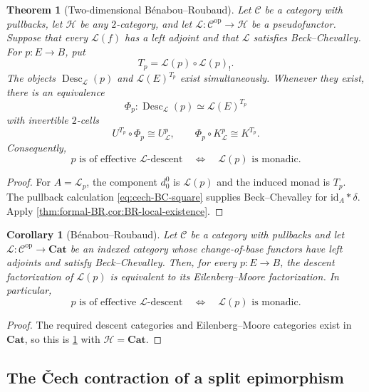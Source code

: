 \documentclass[11pt,a4paper]{article}
\numberwithin{equation}{section}
\newtheorem{theorem}{Theorem}[section]
\newtheorem{corollary}[corollary]{Corollary}
\theoremstyle{definition}
\theoremstyle{remark}
\newcommand{\id}{\mathrm{id}}
\newcommand{\Hcat}{\mathcal H}
\newcommand{\C}{\mathcal C}
\newcommand{\Lx}{\mathcal L}
\newcommand{\Cat}{\mathbf{Cat}}
\newcommand{\Desc}{\operatorname{Desc}}
\begin{document}
\begin{theorem}[Two-dimensional B\'enabou--Roubaud]
\label{thm:two-dimensional-BR}
Let $\C$ be a category with pullbacks, let $\Hcat$ be any
$2$-category, and let
$\Lx\colon\C^{\mathrm{op}}\to\Hcat$ be a pseudofunctor. Suppose that
every $\Lx(f)$ has a left adjoint and that $\Lx$ satisfies
Beck--Chevalley. For $p\colon E\to B$, put
\[
  T_p=\Lx(p)\circ\Lx(p)_!.
\]
The objects $\Desc_{\Lx}(p)$ and $\Lx(E)^{T_p}$ exist simultaneously.
Whenever they exist, there is an equivalence
\begin{equation}
  \Phi_p\colon
  \Desc_{\Lx}(p)\simeq\Lx(E)^{T_p}
  \label{eq:indexed-BR-equivalence}
\end{equation}
with invertible $2$-cells
\[
  U^{T_p}\circ\Phi_p\cong U_{\Lx}^{p},
  \qquad
  \Phi_p\circ K_{\Lx}^{p}\cong K^{T_p}.
\]
Consequently,
\[
  p\text{ is of effective }\Lx\text{-descent}
  \quad\Longleftrightarrow\quad
  \Lx(p)\text{ is monadic}.
\]
\end{theorem}

\begin{proof}
For $A=\Lx_p$, the component $d_0^0$ is $\Lx(p)$ and the induced
monad is $T_p$. The pullback calculation
\eqref{eq:cech-BC-square} supplies Beck--Chevalley for $\id_A\ast\delta$.
Apply \cref{thm:formal-BR,cor:BR-local-existence}.
\end{proof}

\begin{corollary}[B\'enabou--Roubaud]
\label{cor:classical-BR}
Let $\C$ be a category with pullbacks and let
$\Lx\colon\C^{\mathrm{op}}\to\Cat$ be an indexed category whose
change-of-base functors have left adjoints and satisfy
Beck--Chevalley. Then, for every $p\colon E\to B$, the descent
factorization of $\Lx(p)$ is equivalent to its Eilenberg--Moore
factorization. In particular,
\[
  p\text{ is of effective }\Lx\text{-descent}
  \quad\Longleftrightarrow\quad
  \Lx(p)\text{ is monadic}.
\]
\end{corollary}

\begin{proof}
The required descent categories and Eilenberg--Moore categories exist
in $\Cat$, so this is \cref{thm:two-dimensional-BR} with
$\Hcat=\Cat$.
\end{proof}

\subsection{The \v{C}ech contraction of a split epimorphism}
\end{document}
